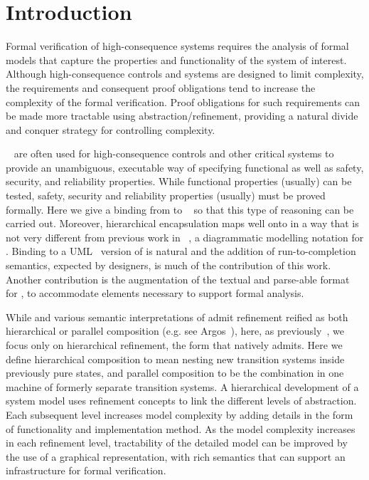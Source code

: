 
\section{Introduction}
\label{sec:introduction}

Formal verification of high-consequence systems requires the analysis
of formal models that capture the properties and functionality of the
system of interest. Although high-consequence controls and systems are
designed to limit complexity, the requirements and consequent proof
obligations tend to increase the complexity of the formal verification.  
Proof obligations for such requirements can be made more tractable using
abstraction/refinement, providing a natural divide and conquer
strategy for controlling complexity.

\Statecharts~\cite{Harel} are often used for high-consequence controls
and other critical systems to provide an unambiguous, executable way
of specifying functional as well as safety, security, and reliability
properties.  While functional properties (usually) can be tested,
safety, security and reliability properties (usually) must be proved
formally.  Here we give a binding from \Statecharts to \EventB~\cite{abrial10:_model_event_b} so that
this type of reasoning can be carried out.  Moreover, hierarchical
encapsulation maps well onto \Statecharts in a way that is not very
different from previous work in \iUMLB~\cite{snook14:_b_statem,Snook2006,Snook12:FMCO}, a diagrammatic modelling notation for \EventB.
Binding \iUMLB to a UML~\cite{Rumbaugh2004} version of \Statecharts is natural and the
addition of run-to-completion semantics, expected by \Statechart
designers, is much of the contribution of this work.  Another
contribution is the augmentation of the textual and parse-able format
for \Statecharts, \SCXML to accommodate elements necessary to support formal
analysis. 

While \Statecharts and various semantic interpretations of
\Statecharts admit refinement reified as both hierarchical or parallel
composition (e.g. see Argos~\cite{Maraninchi91theargos}), here, as
previously~\cite{snook14:_b_statem}, we focus only on hierarchical
refinement, the form that \EventB natively admits.  Here we define
hierarchical composition to mean nesting new transition systems inside
previously pure states, and parallel composition to be the combination
in one machine of formerly separate transition systems.
A hierarchical development of a system model uses refinement
concepts to link the different levels of abstraction. Each subsequent
level increases model complexity by adding details in the form of
functionality and implementation method. As the model complexity
increases in each refinement level, tractability of the detailed model
can be improved by the use of a graphical representation, with rich
semantics that can support an infrastructure for formal verification.


